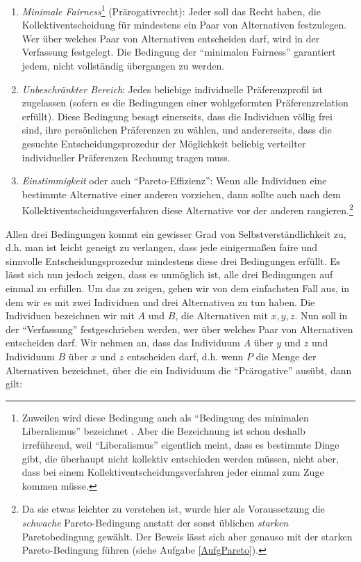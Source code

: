 \begin{enumerate} 
  \item {\em Minimale Fairness}\footnote{Zuweilen wird diese Bedingung auch als
  "`Bedingung des minimalen Liberalismus"' bezeichnet
  \cite[]{kliemt-lahno:2005}. Aber die Bezeichnung ist schon deshalb irreführend, 
  weil "`Liberalismus"' eigentlich meint, dass es 
  bestimmte Dinge gibt, die überhaupt nicht kollektiv entschieden werden
  müssen, nicht aber, dass bei einem Kollektiventscheidungsverfahren jeder
  einmal zum Zuge kommen müsse.} (Prärogativrecht): Jeder soll das Recht haben,
  die Kollektiventscheidung für mindestens ein Paar von Alternativen festzulegen. 
  Wer über welches Paar von Alternativen 
  entscheiden darf, wird in der Verfassung festgelegt. Die Bedingung der
  "`minimalen Fairness"' garantiert jedem, nicht vollständig übergangen zu
  werden.
  
  \item {\em Unbeschränkter Bereich}: Jedes beliebige individuelle
  Präferenzprofil ist zugelassen (sofern es die Bedingungen einer wohlgeformten
  Präferenzrelation erfüllt). Diese Bedingung besagt einerseits, dass die
  Individuen völlig frei sind, ihre persönlichen Präferenzen zu wählen, und
  andererseits, dass die gesuchte Entscheidungsprozedur der Möglichkeit
  beliebig verteilter individueller Präferenzen Rechnung tragen muss.
  
  \item {\em Einstimmigkeit} oder auch "`Pareto-Effizienz"': Wenn alle
  Individuen eine bestimmte Alternative einer anderen vorziehen, dann sollte
  auch nach dem Kollektiventscheidungsverfahren diese Alternative vor der anderen
  rangieren.\footnote{Da sie etwas leichter zu verstehen ist, wurde hier als
  Voraussetzung die {\em schwache} Pareto-Bedingung anstatt der sonst üblichen
  {\em starken} Paretobedingung gewählt. Der Beweis lässt sich aber genauso
  mit der starken Pareto-Bedingung führen (siehe Aufgabe \ref{AufgPareto}).}
\end{enumerate}

Allen drei Bedingungen kommt ein gewisser Grad von Selbst\-ver\-ständ\-lich\-keit
zu, d.h. man ist leicht geneigt zu verlangen, dass jede einigermaßen faire und
sinnvolle Entscheidungsprozedur mindestens diese drei Bedingungen
erfüllt. Es lässt sich nun jedoch zeigen, dass es unmöglich ist, alle drei
Bedingungen auf einmal zu erfüllen. Um das zu zeigen, gehen wir von dem
einfachsten Fall aus, in dem wir es mit zwei Individuen und drei Alternativen zu
tun haben. Die Individuen bezeichnen wir mit $A$ und $B$, die Alternativen mit
$x,y,z$. Nun soll in der "`Verfassung"' festgeschrieben werden, wer über welches
Paar von Alternativen entscheiden darf. Wir nehmen an, dass das Individuum $A$
über $y$ und $z$ und Individuum $B$ über $x$ und $z$ entscheiden darf, d.h. wenn
$P$ die Menge der Alternativen bezeichnet, über die ein Individuum die
"`Prärogative"' ausübt, dann gilt:

